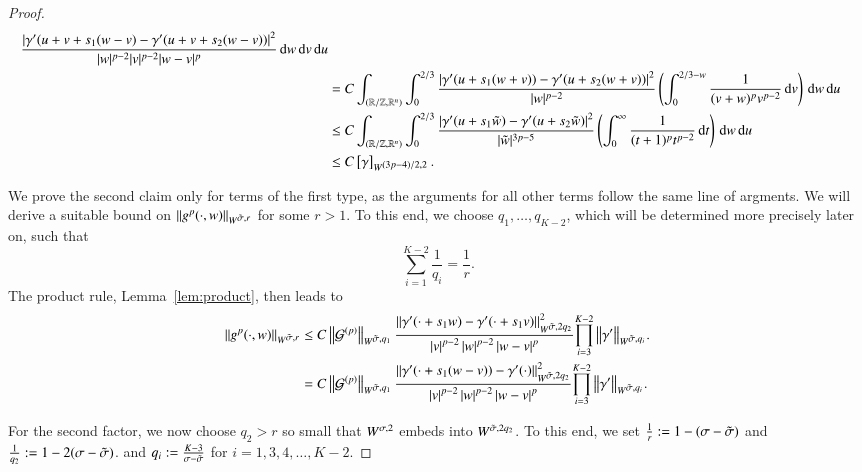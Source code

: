 \begin{proof}
\begin{align*}
   \frac{\abs{\dg(u+v+s_{1}(w-v)-\dg(u+v + s_{2}(w-v))}^{2}}{ |w|^{p-2} |v|^{p-2} |w-v|^p} \d w \d v \d u \\
   & =  C \int_{\rzd} \int_0^{2/3} \frac{\abs{\dg(u+s_{1}(w+v))-\dg(u+s_2 (w+v))}^{2}}{ |w|^{p-2}} \left(\int_{0}^{2/3- w} \frac 1 {(v+w)^{p} v^{p-2}}\d v\right) \d w \d u \\
   & \le C \int_{\rzd} \int_0^{2/3} \frac{\abs{\dg(u+s_{1}\tilde w)-\dg(u+s_2 \tilde w)}^{2}}{ |\tilde w|^{3p-5}} \left(\int_{0}^{\infty} \frac 1 {(t +1)^{p}t^{p-2}}\d t\right) \d w \d u \\
   & \le  C\seminorm\g_{\W[(3p-4)/2,2]}.
  \end{align*}
  
  We prove the second claim only for terms of the first type, as the arguments for all other terms follow the same line of argments.
  We will derive a suitable bound on $\norm{\gp(\cdot,w)}_{\W[\tilde\s,r]}$ for some $r>1$.
  To this end, we choose $q_{1},\dots,q_{K-2}$, which will be determined more precisely later on,
  such that
  \begin{equation*}
    \sum_{i=1}^{K-2} \frac 1 {q_i} = \frac 1 r.
  \end{equation*}
  The product rule, Lemma~\ref{lem:product}, then leads to 
  \begin{align*} 
  \norm{\gp(\cdot,w)}_{\W[\tilde\s,r]} &\le C\norm{\G}_{\W[\tilde\s,q_{1}]}\frac{\norm{\dg(\cdot+s_{1}w)-\dg(\cdot+s_{1}v)}_{\W[\tilde\s,2q_{2}]}^{2}}{\abs v ^{p-2}\abs w^{p-2} \abs{w-v}^p}{\prod_{i=3}^{K-2}\norm\dg_{\W[\tilde\s,q_{i}]}}. 
  \\ & =C\norm{\G}_{\W[\tilde\s,q_{1}]}\frac{\norm{\dg(\cdot+s_{1}(w-v))-\dg(\cdot)}_{\W[\tilde\s,2q_{2}]}^{2}}{\abs v ^{p-2}\abs w^{p-2} \abs{w-v}^p}{\prod_{i=3}^{K-2}\norm\dg_{\W[\tilde\s,q_{i}]}}. 
  \end{align*}
  
  For the second factor, we now choose $q_{2}>r$ so small that
  $\W[\s,2]$ embeds into $\W[\tilde\s,2q_{2}]$.
  To this end, we set $\frac1r:=1-(\s-\tilde\s)$ and $\frac1{q_{2}}:=1-2(\s-\tilde\s)$.
  and $q_{i}:=\frac{K-3}{\s-\tilde\s}$ for $i=1,3,4, \ldots, K-2$.
  

\end{proof}
